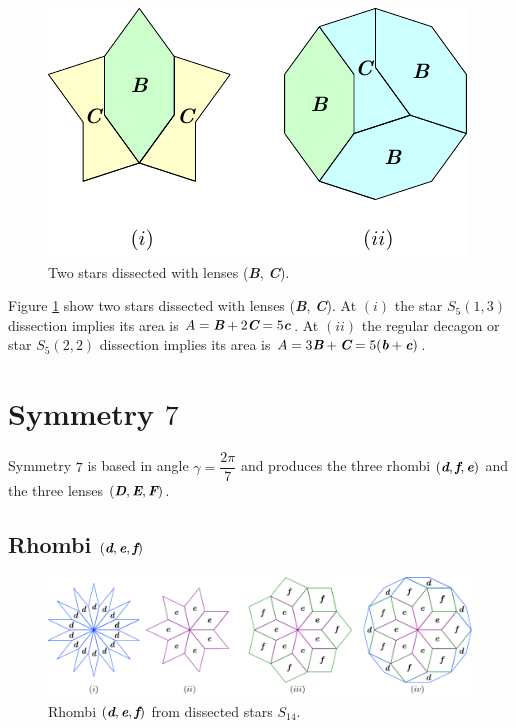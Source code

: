 \documentclass[11pt]{article}
\def\mathbi#1{\textbf{\em #1}}
\begin{document}
\begin{figure}[H]
\centering
\includegraphics[scale=1.1]{bc/bc-stars-2}
\caption{Two stars dissected with lenses (\mathbi{B}, \mathbi{C}).}
\label{fig:bc-stars-2}
\end{figure}

Figure \ref{fig:bc-stars-2} show two stars dissected with lenses (\mathbi{B}, \mathbi{C}).
At $(i)$ the star $S_5(1,3)$ dissection implies its area is $A = \mathbi{B} + 2\mathbi{C} = 5\mathbi{c}$.
At $(ii)$ the regular decagon or star $S_5(2,2)$ dissection implies its area is $A = 3\mathbi{B} + \mathbi{C} = 5(\mathbi{b} + \mathbi{c})$.



\section{Symmetry $7$}

Symmetry $7$ is based in angle $\gamma = \dfrac{2\pi}7$ and produces the three rhombi $(\mathbi{d},\mathbi{f},\mathbi{e})$ and the three lenses $(\mathbi{D},\mathbi{E},\mathbi{F})$.

\subsection{Rhombi $(\mathbi{d},\mathbi{e},\mathbi{f})$}

\begin{figure}[H]
\centering
\includegraphics[scale=1]{def/rhombi}
\caption{Rhombi $(\mathbi{d},\mathbi{e},\mathbi{f})$ from dissected stars $S_{14}$. }
\label{fig:def-rhombi}
\end{figure}
\end{document}
